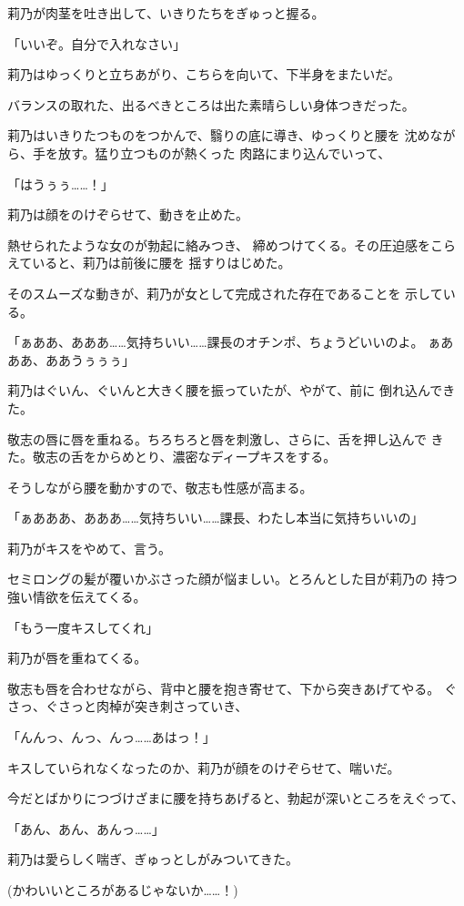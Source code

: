 ﻿\documentclass[
    book,tate,
    line_length=30zw,
    jafontsize=12pt,
    paper=b5j,
    landscape,
    ]{jlreq}
\begin{document}
莉乃が肉茎を吐き出して、いきりたちをぎゅっと握る。

「いいぞ。自分で入れなさい」

莉乃はゆっくりと立ちあがり、こちらを向いて、下半身をまたいだ。

バランスの取れた、出るべきところは出た素晴らしい身体つきだった。

莉乃はいきりたつものをつかんで、翳りの底に導き、ゆっくりと腰を
沈めながら、手を放す。猛り立つものが熱くった
肉路にまり込んでいって、

「はうぅぅ……！」

莉乃は顔をのけぞらせて、動きを止めた。

熱せられたような女のが勃起に絡みつき、
締めつけてくる。その圧迫感をこらえていると、莉乃は前後に腰を
揺すりはじめた。

そのスムーズな動きが、莉乃が女として完成された存在であることを
示している。

「ぁああ、あああ……気持ちいい……課長のオチンポ、ちょうどいいのよ。
ぁあああ、ああうぅぅぅ」

莉乃はぐいん、ぐいんと大きく腰を振っていたが、やがて、前に
倒れ込んできた。

敬志の唇に唇を重ねる。ちろちろと唇を刺激し、さらに、舌を押し込んで
きた。敬志の舌をからめとり、濃密なディープキスをする。

そうしながら腰を動かすので、敬志も性感が高まる。

「ぁあああ、あああ……気持ちいい……課長、わたし本当に気持ちいいの」

莉乃がキスをやめて、言う。

セミロングの髪が覆いかぶさった顔が悩ましい。とろんとした目が莉乃の
持つ強い情欲を伝えてくる。

「もう一度キスしてくれ」

莉乃が唇を重ねてくる。

敬志も唇を合わせながら、背中と腰を抱き寄せて、下から突きあげてやる。
ぐさっ、ぐさっと肉棹が突き刺さっていき、

「んんっ、んっ、んっ……あはっ！」

キスしていられなくなったのか、莉乃が顔をのけぞらせて、喘いだ。

今だとばかりにつづけざまに腰を持ちあげると、勃起が深いところをえぐって、

「あん、あん、あんっ……」

莉乃は愛らしく喘ぎ、ぎゅっとしがみついてきた。

(かわいいところがあるじゃないか……！)
\end{document}
